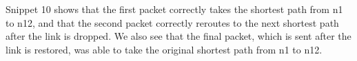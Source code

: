\documentclass[11pt]{article}
\begin{document}
Snippet 10 shows that the first packet correctly takes the shortest path from n1 to n12, and that the second packet correctly reroutes to the next shortest path after the link is dropped. We also see that the final packet, which is sent after the link is restored, was able to take the original shortest path from n1 to n12.
\end{document}
